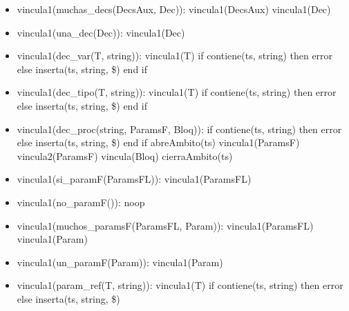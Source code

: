 \documentclass[11pt]{article}
\begin{document}
            \begin{itemize}
                \item vincula1(muchas\_decs(DecsAux, Dec)):
                    \subitem vincula1(DecsAux)
                    \subitem vincula1(Dec)
                \item vincula1(una\_dec(Dec)):
                    \subitem vincula1(Dec)
                \item vincula1(dec\_var(T, string)):
                    \subitem vincula1(T)
                    \subitem if contiene(ts, string) then
                        \subsubitem error
                    \subitem else
                        \subsubitem inserta(ts, string, \$)
                    \subitem end if 
                \item vincula1(dec\_tipo(T, string)):
                    \subitem vincula1(T)
                    \subitem if contiene(ts, string) then
                        \subsubitem error
                    \subitem else
                        \subsubitem inserta(ts, string, \$)
                    \subitem end if
                \item vincula1(dec\_proc(string, ParamsF, Bloq)):
                    \subitem if contiene(ts, string) then
                        \subsubitem error
                    \subitem else
                        \subsubitem inserta(ts, string, \$)
                    \subitem end if
                    \subitem abreAmbito(ts)
                    \subitem vincula1(ParamsF)
                    \subitem vincula2(ParamsF)
                    \subitem vincula(Bloq)
                    \subitem cierraAmbito(ts)
                \item vincula1(si\_paramF(ParamsFL)):
                    \subitem vincula1(ParamsFL)
                \item vincula1(no\_paramF()):
                    \subitem noop
                \item vincula1(muchos\_paramsF(ParamsFL, Param)):
                    \subitem vincula1(ParamsFL)
                    \subitem vincula1(Param)
                \item vincula1(un\_paramF(Param)): 
                    \subitem vincula1(Param) 
                \item vincula1(param\_ref(T, string)): 
                    \subitem vincula1(T) 
                    \subitem if contiene(ts, string) then 
                        \subsubitem error 
                    \subitem else 
                        \subsubitem inserta(ts, string, \$) 

\end{itemize}
\end{document}
